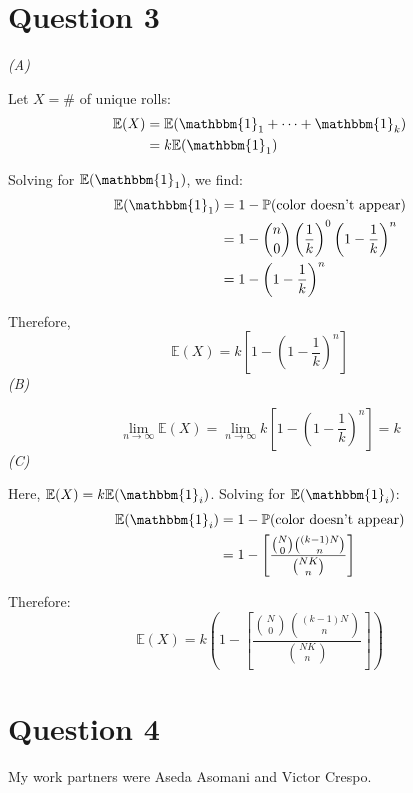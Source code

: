 \documentclass[titlepage, 12pt, leqno]{article}
\begin{document}
\pagebreak
\section{Question 3}
\textit{(A)}

Let $X = \# $ of unique rolls:
\begin{align*}
    \mathbb{E}(X) &= \mathbb{E}( \mathbbm{1}_{1} + \cdots + \mathbbm{1}_{k}) \\
                  &= k \mathbb{E}( \mathbbm{1}_{1})
\end{align*}

Solving for $ \mathbb{E}( \mathbbm{1}_{1})$, we find:
\begin{align*}
    \mathbb{E}( \mathbbm{1}_{1}) &= 1- \mathbb{P}( \text{color doesn't appear}) \\
                                 &= 1 - \binom{n}{0} \left(\frac{1}{k}\right)^0
                                 \left(1-\frac{1}{k}\right)^n \\
                                 &= 1 - \left(1-\frac{1}{k}\right)^n
\end{align*}

Therefore,
\[
    \boxed{ \mathbb{E}(X) = k\left[1-\left(1-\frac{1}{k}\right)^n\right]} 
\]
\textit{(B)}

\[
    \lim_{n \to \infty} \mathbb{E}(X) = \lim_{n \to \infty} k\left[
    1-\left(1-\frac{1}{k}\right)^n\right] = \boxed{k}
\]
\textit{(C)}

Here, $ \mathbb{E}(X) = k \mathbb{E}( \mathbbm{1}_{i})$. Solving for $ 
\mathbb{E}( \mathbbm{1}_{i})$:
\begin{align*}
    \mathbb{E}( \mathbbm{1}_{i}) &= 1 - \mathbb{P}( \text{color doesn't appear})\\
                                 &= 1 - \left[\frac{
                                     \binom{N}{0}\binom{(k-
                             1)N}{n}}{\binom{NK}{n}}\right] \\
\end{align*}

Therefore:
\[
\boxed{ \mathbb{E}(X) = k\left(1 - \left[
    \frac{\binom{N}{0}\binom{(k-1)N}{n}}{\binom{NK}{n}}\right]\right)} 
\]
\pagebreak
\section{Question 4}
My work partners were Aseda Asomani and Victor Crespo.
\end{document}
